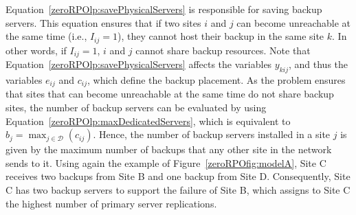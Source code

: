 \documentclass[preprint]{elsarticle}
\begin{document}
Equation~\ref{zeroRPOlp:savePhysicalServers} is responsible for saving backup servers. This equation ensures that if two sites $i$ and $j$ can become unreachable at the same time (i.e., $I_{ij} = 1$), they cannot host their backup in the same site $k$. In other words, if $I_{ij} = 1$, $i$ and $j$ cannot share backup resources. Note that Equation~\ref{zeroRPOlp:savePhysicalServers} affects the variables $y_{kij}$, and thus the variables $e_{ij}$ and $c_{ij}$, which define the backup placement.
As the problem ensures that sites that can become unreachable at the same time do not share backup sites, the number of backup servers can be evaluated by using 
Equation~\ref{zeroRPOlp:maxDedicatedServers}, which is equivalent to $b_j = \max_{j \in \mathcal{D}} (c_{ij})$. Hence, the number of backup servers installed in a site $j$ is given by the maximum number of backups that any other site in the network sends to it.
Using again the example of Figure~\ref{zeroRPOfig:modelA}, Site C receives two backups from Site B and one backup from Site D. Consequently, Site C has two backup servers to support the failure of Site B, which assigns to Site C the highest number of primary server replications.
\end{document}
